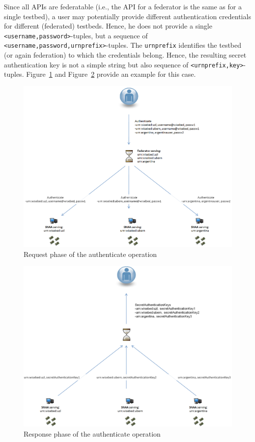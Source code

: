 \documentclass[a4paper,12pt]{article}
\begin{document}
Since all APIs are federatable (i.e., the API for a federator is the same as for a single testbed), a user may potentially provide different authentication credentials for different (federated) testbeds. Hence, he does not provide a single \lstinline{<username,password>}-tuples, but a sequence of \lstinline{<username,password,urnprefix>}-tuples. The \lstinline{urnprefix} identifies the testbed (or again federation) to which the credentials belong. 
Hence, the resulting secret authentication key is not a simple string but also sequence of \lstinline{<urnprefix,key>}-tuples. Figure~\ref{fig:example-authenticate-request} and Figure~\ref{fig:example-authenticate-response} provide an example for this case. 

\begin{figure}[htb]
      \begin{center}
      \includegraphics[width=.8\textwidth]{fig/example-authenticate-request}
      \caption{Request phase of the authenticate operation}
      \label{fig:example-authenticate-request}
      \end{center}
\end{figure}

\begin{figure}[htb]
      \begin{center}
      \includegraphics[width=.8\textwidth]{fig/example-authenticate-response}
      \caption{Response phase of the authenticate operation}
      \label{fig:example-authenticate-response}
      \end{center}
\end{figure}
\end{document}
